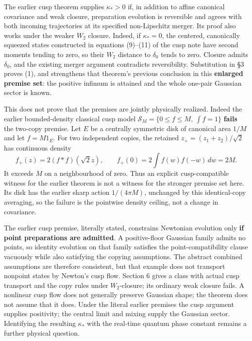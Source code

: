 \documentclass[11pt,a4paper]{article}
\begin{document}
The earlier cusp theorem supplies \(\kappa_*>0\) if, in addition to
affine canonical covariance and weak closure, preparation evolution is
reversible and agrees with both incoming trajectories at its specified
non-Lipschitz merger. Its proof also works under the weaker \(W_2\)
closure. Indeed, if \(\kappa_*=0\), the centered, canonically squeezed
states constructed in equations (9)--(11) of the cusp note have second
moments tending to zero, so their \(W_2\) distance to \(\delta_0\) tends
to zero. Closure admits \(\delta_0\), and the existing merger argument
contradicts reversibility. Substitution in §3 proves (1), and
strengthens that theorem's previous conclusion in this \textbf{enlarged
premise set}: the positive infimum is attained and the whole one-pair
Gaussian sector is known.

This does not prove that the premises are jointly physically realized.
Indeed the earlier bounded-density classical cusp model
\(\mathcal S_M=\{0\le f\le M,\ \int f=1\}\) \textbf{fails} the two-copy
premise. Let \(E\) be a centrally symmetric disk of canonical area
\(1/M\) and let \(f=M1_E\). For two independent copies, the retained
\(z_+=(z_1+z_2)/\sqrt2\) has continuous density
\[f_+(z)=2(f*f)(\sqrt2z),\qquad
 f_+(0)=2\int f(w)f(-w)\,dw=2M.\tag{14a}\] It exceeds \(M\) on a
neighbourhood of zero. Thus an explicit cusp-compatible witness for the
earlier theorem is not a witness for the stronger premise set here. Its
disk has the earlier sharp action \(1/(4\pi M)\), unchanged by this
identical-copy averaging, so the failure is the pointwise density
ceiling, not a change in covariance.

The earlier cusp premise, literally stated, constrains Newtonian
evolution only \textbf{if point preparations are admitted}. A
positive-floor Gaussian family admits no points, so identity evolution
on that family satisfies the point-compatibility clause vacuously while
also satisfying the copying assumptions. The abstract combined
assumptions are therefore consistent, but that example does not
transport nonpoint states by Newton's cusp flow. Section 6 gives a class
with actual cusp transport and the copy rules under \(W_2\)-closure; its
ordinary weak closure fails. A nonlinear cusp flow does not generally
preserve Gaussian shape; the theorem does not assume that it does. Under
the literal earlier premises the cusp argument supplies positivity; the
central limit and mixing supply the Gaussian sector. Identifying the
resulting \(\kappa_*\) with the real-time quantum phase constant remains
a further physical question.
\end{document}
